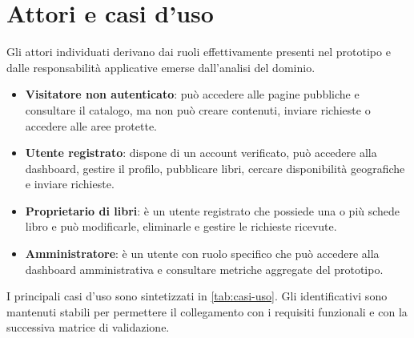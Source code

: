 \section{Attori e casi d'uso}
\label{sec:attori-casi-uso}

Gli attori individuati derivano dai ruoli effettivamente presenti nel prototipo e dalle responsabilità applicative emerse dall'analisi del dominio.

\begin{itemize}
    \item \textbf{Visitatore non autenticato}: può accedere alle pagine pubbliche e consultare il catalogo, ma non può creare contenuti, inviare richieste o accedere alle aree protette.
    \item \textbf{Utente registrato}: dispone di un account verificato, può accedere alla dashboard, gestire il profilo, pubblicare libri, cercare disponibilità geografiche e inviare richieste.
    \item \textbf{Proprietario di libri}: è un utente registrato che possiede una o più schede libro e può modificarle, eliminarle e gestire le richieste ricevute.
    \item \textbf{Amministratore}: è un utente con ruolo specifico che può accedere alla dashboard amministrativa e consultare metriche aggregate del prototipo.
\end{itemize}

I principali casi d'uso sono sintetizzati in \cref{tab:casi-uso}. Gli identificativi sono mantenuti stabili per permettere il collegamento con i requisiti funzionali e con la successiva matrice di validazione.

